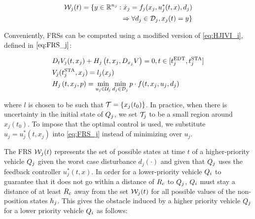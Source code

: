 \begin{equation}
\label{eq:frs}
\begin{aligned}
\mathcal{W}_j(t) = \{y \in \mathbb{R}^{n_j}: \dot{x}_j = f_j(x_j, u_j^*(t, x), d_j) \\
\Rightarrow \forall d_j \in \mathcal{D}_j, x_j(t) = y\}
\end{aligned}
\end{equation}

Conveniently, FRSs can be computed using a modified version of \eqref{eq:HJIVI_i}, defined in $\eqref{eq:FRS_j}$:

\begin{equation}
\label{eq:FRS_j}
\begin{aligned}
&D_t V_j(t, x_j) + H_j\left(t, x_j, D_{x_j} V\right) = 0, t \in [t^\text{EDT}_j, t^\text{STA}_j]\\
&V_j(t^\text{STA}_j, x_j) =l_j(x_j) \\
&H_j\left(t, x_j, p\right) = \min_{u_j \in \mathcal{U}_j} \min_{d_j \in \mathcal{D}_j} p \cdot f(t, x_j, u_j, d_j)
\end{aligned}
\end{equation}

\noindent where $l$ is chosen to be such that $\mathcal{T} = \{x_j(t_0)\}$.  In practice, when there is uncertainty in the initial state of $Q_j$, we set $\mathcal{T}_j$ to be a small region around $x_j(t_0)$. To impose that the optimal control is used, we substitute $u_j = u_j^*(t, x_j)$ into \eqref{eq:FRS_j} instead of minimizing over $u_j$. 

The FRS $\mathcal{W}_j(t)$ represents the set of possible states at time $t$ of a higher-priority vehicle $Q_j$ given the worst case disturbance $d_j(\cdot)$ and given that $Q_j$ uses the feedback controller $u_j^*(t, x)$. In order for a lower-priority vehicle $Q_i$ to guarantee that it does not go within a distance of $R_c$ to $Q_j$, $Q_i$ must stay a distance of at least $R_c$ away from the set $\mathcal{W}_j(t)$ for all possible values of the non-position states $h_j$. This gives the obstacle induced by a higher priority vehicle $Q_j$ for a lower priority vehicle $Q_i$ as follows:

